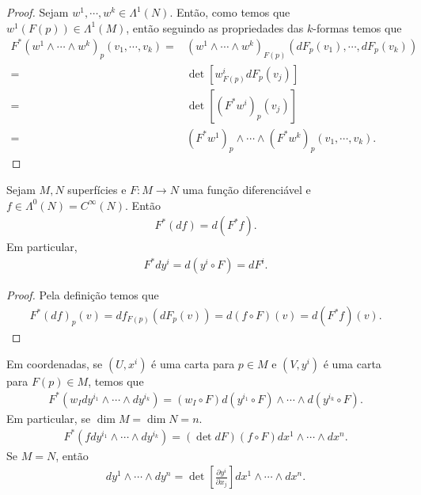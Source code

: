 \begin{proof} 
  Sejam $w^{1},\cdots, w^{k}\in\Lambda^{1}(N)$. Então, como temos que $w^{1}(F(p))\in\Lambda^{1}(M)$, então seguindo as propriedades das $k$-formas temos que
  \begin{align*}
    F^{\ast}(w^{1}\wedge\cdots\wedge w^{k})_p(v_1,\cdots,v_k)=&\left( w^1\wedge\cdots\wedge w^{k} \right)_{F(p)}\left( dF_p(v_1),\cdots,dF_p(v_k) \right)\\
    =&\det\left[ w^{i}_{F(p)}dF_p(v_j) \right]\\
    =&\det\left[ (F^{\ast}w^{i})_p(v_j) \right]\\
    =&(F^{\ast}w^1)_p\wedge\cdots\wedge(F^{\ast}w^k)_p(v_1,\cdots,v_k).
  \end{align*}
\end{proof}
\begin{proposition}\label{prop:pullback-0-forma}
  Sejam $M,N$ superfícies e $F:M\to N$ uma função diferenciável e $f\in\Lambda^{0}(N)=C^{\infty}(N)$. Então
  \begin{align*}
    F^{\ast}(df)=d(F^{\ast}f).
  \end{align*}
  Em particular,
  \begin{align*}
    F^{\ast}dy^{i}=d(y^{i}\circ F)=dF^{i}.
  \end{align*}
\end{proposition}
\begin{proof} 
  Pela definição temos que
  \begin{align*}
    F^{\ast}(df)_p(v)=df_{F(p)}(dF_p(v))=d(f\circ F)(v)=d(F^{\ast}f)(v).
  \end{align*}
\end{proof}
\begin{corollary}\label{cor:pullback-formas}
  Em coordenadas, se $(U,x^{i})$ é uma carta para $p\in M$ e $(V,y^{i})$ é uma carta para $F(p)\in M$, temos que
  \begin{align*}
    F^{\ast}(w_Idy^{i_1}\wedge\cdots\wedge dy^{i_k})=(w_I\circ F)d(y^{i_1}\circ F)\wedge\cdots\wedge d(y^{i_k}\circ F).
  \end{align*}
  Em particular, se $\dim M=\dim N=n$.
  \begin{align*}
    F^{\ast}(fdy^{i_1}\wedge\cdots\wedge dy^{i_k})=(\det dF)(f\circ F)dx^{1}\wedge\cdots\wedge dx^{n}.
  \end{align*}
  Se $M=N$, então
  \begin{align*}
    dy^{1}\wedge\cdots\wedge dy^{n}=\det\left[ \frac{\partial y^{i}}{\partial x_j} \right]dx^{1}\wedge\cdots\wedge dx^{n}.
  \end{align*}
\end{corollary}
